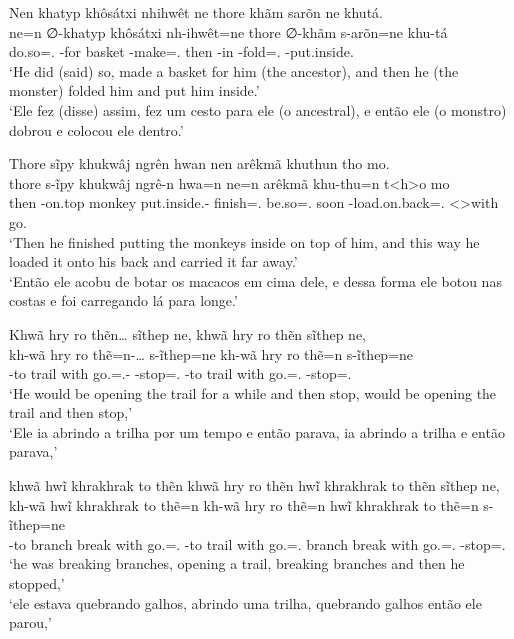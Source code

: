 \documentclass[output=paper,
modfonts,nonflat
]{langsci/langscibook}
\begin{document}
\newpage 
\ea  Nen khatyp khôsátxi nhihwêt ne thore khãm sarõn ne khutá. \\[.3em]
\gll ne=n             ∅-khatyp   khôsátxi nh-ihwêt=ne        thore ∅-khãm    s-arõn=ne              khu-tá                  \\
     do.so=\AAnd.\Ss{} \Third-for basket   \E-make=\AAnd.\Ss{} then  \Third-in \Third-fold=\AAnd.\Ss{} \Third-put.inside.\Sg{} \\
\glt `He did (said) so, made a basket for him (the ancestor), and then he (the monster) folded him and put him inside.' \\
     `Ele fez (disse) assim, fez um cesto para ele (o ancestral), e então ele (o monstro) dobrou e colocou ele dentro.' \\
\z

\ea  Thore sĩpy khukwâj ngrên hwan nen arêkmã khuthun tho mo. \\[.3em]
\gll thore s-ĩpy         khukwâj ngrê-n                 hwa=n             ne=n             arêkmã khu-thu=n                      t<h>o        mo       \\
     then  \Third-on.top monkey  put.inside.\Pl-\Nmlz{} finish=\AAnd.\Ss{} be.so=\AAnd.\Ss{} soon   \Third-load.on.back=\AAnd.\Ss{} <\Third>with go.\Pl{} \\
\glt `Then he finished putting the monkeys inside on top of him, and this way he loaded it onto his back and carried it far away.' \\
     `Então ele acobu de botar os macacos em cima dele, e dessa forma ele botou nas costas e foi carregando lá para longe.' \\
\z

\ea  Khwã hry ro thẽn\ldots{} sĩthep ne, khwã hry ro thẽn sĩthep ne, \\[.3em]
\gll kh-wã     hry   ro   thẽ=n-\ldots{}           s-ĩthep=ne             kh-wã     hry   ro   thẽ=n             s-ĩthep=ne             \\
     \Third-to trail with go.\Sg=\AAnd.\Ss-\Ints{} \Third-stop=\AAnd.\Ss{} \Third-to trail with go.\Sg=\AAnd.\Ss{} \Third-stop=\AAnd.\Ss{} \\
\glt `He would be opening the trail for a while and then stop, would be opening the trail and then stop,' \\
     `Ele ia abrindo a trilha por um tempo e então parava, ia abrindo a trilha e então parava,' \\
\label{exe:adjppargppver}
\z

\ea  khwã hwĩ khrakhrak to thẽn khwã hry ro thẽn hwĩ khrakhrak to thẽn sĩthep ne, \\[.3em]
\gll kh-wã     hwĩ    khrakhrak to   thẽ=n             kh-wã     hry   ro   thẽ=n             hwĩ    khrakhrak to   thẽ=n             s-ĩthep=ne             \\
     \Third-to branch break     with go.\Sg=\AAnd.\Ss{} \Third-to trail with go.\Sg=\AAnd.\Ss{} branch break     with go.\Sg=\AAnd.\Ss{} \Third-stop=\AAnd.\Ss{} \\
\glt `he was breaking branches, opening a trail, breaking branches and then he stopped,' \\
     `ele estava quebrando galhos, abrindo uma trilha, quebrando galhos então ele parou,' \\
\z
\end{document}
